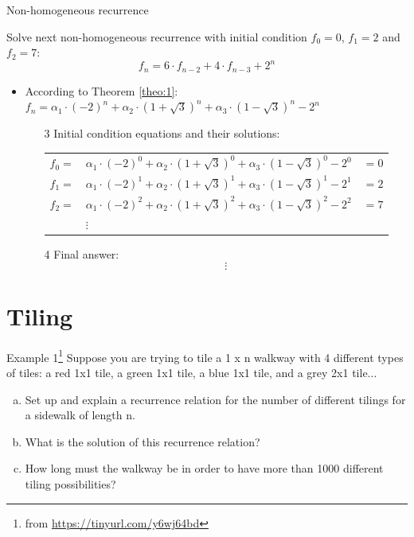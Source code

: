 \documentclass{beamer}
\begin{document}
\begin{frame}{Non-homogeneous recurrence}

    {\small Solve next non-homogeneous recurrence with initial condition $f_0=0$, $f_1=2$ and $f_2=7$:
    \begin{equation}\tag{1}
        f_n = 6 \cdot f_{n-2} + 4 \cdot f_{n-3} + 2^n
    \end{equation} }
    \begin{itemize}
        \item According to Theorem \ref{theo:1}: 
            $ f_n = \alpha_1 \cdot (-2)^n + \alpha_2 \cdot (1+\sqrt{3})^n + \alpha_3 \cdot (1-\sqrt{3})^n - 2^n $
        \begin{enumerate}    
            \item[3] Initial condition equations and their solutions:
                \begin{tabular}{l l l}
                    $f_0 = $ & $\alpha_1 \cdot (-2)^0 + \alpha_2 \cdot (1+\sqrt{3})^0 + \alpha_3 \cdot (1-\sqrt{3})^0 - 2^0$ & $= 0$ \\ 
                    $f_1 = $ & $\alpha_1 \cdot (-2)^1 + \alpha_2 \cdot (1+\sqrt{3})^1 + \alpha_3 \cdot (1-\sqrt{3})^1 - 2^1$ & $= 2$ \\ 
                    $f_2 = $ & $\alpha_1 \cdot (-2)^2 + \alpha_2 \cdot (1+\sqrt{3})^2 + \alpha_3 \cdot (1-\sqrt{3})^2 - 2^2$ & $= 7$ \\
                             & $\vdots$                                                                                      &
                \end{tabular}
            \item[4] Final answer:
                $$ \vdots $$
        \end{enumerate}
    \end{itemize}
\end{frame}

\section{Tiling}

\begin{frame}{Example 1\footnote{from \url{https://tinyurl.com/y6wj64bd}}}
    Suppose you are trying to tile a 1 x n walkway with 4 different types of tiles: a red 1x1 tile, a green 1x1 tile, a blue 1x1 tile, and a grey 2x1 tile...
    \begin{enumerate}[a)]
        \item Set up and explain a recurrence relation for the number of different tilings for a sidewalk of length n.
        \item What is the solution of this recurrence relation?
        \item How long must the walkway be in order to have more than 1000 different tiling possibilities? 
    \end{enumerate}
\end{frame}
\end{document}
